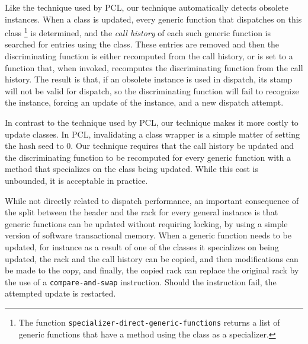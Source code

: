 Like the technique used by PCL, our technique automatically detects
obsolete instances.  When a class is updated, every generic function
that dispatches on this class%
\footnote{The function
  \texttt{specializer-direct-generic-functions} returns a list of
  generic functions that have a method using the class as a specializer.}
is determined, and the \emph{call history} of each such generic
function is searched for entries using the class.  These entries are
removed and then the discriminating function is either recomputed from
the call history, or is set to a function that, when invoked,
recomputes the discriminating function from the call history.   The
result is that, if an obsolete instance is used in dispatch, its stamp
will not be valid for dispatch, so the discriminating function will
fail to recognize the instance, forcing an update of the instance, and
a new dispatch attempt. 

In contrast to the technique used by PCL, our technique makes it more
costly to update classes.  In PCL, invalidating a class wrapper is a
simple matter of setting the hash seed to $0$.  Our technique requires
that the call history be updated and the discriminating function to be
recomputed for every generic function with a method that specializes
on the class being updated.  While this cost is unbounded, it is
acceptable in practice. 

While not directly related to dispatch performance, an important
consequence of the split between the header and the rack for every
general instance is that generic functions can be updated without
requiring locking, by using a simple version of software transactional
memory.  When a generic function needs to be updated, for instance as
a result of one of the classes it specializes on being updated, the
rack and the call history can be copied, and then modifications can be
made to the copy, and finally, the copied rack can replace the
original rack by the use of a \texttt{compare-and-swap} instruction.
Should the instruction fail, the attempted update is restarted. 

